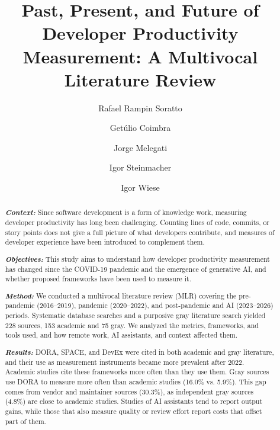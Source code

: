 \documentclass[preprint,number]{elsarticle}
\newcounter{study}
\begin{document}
\begin{frontmatter}

\title{Past, Present, and Future of Developer Productivity Measurement: A Multivocal Literature Review}

\author[a]{Rafael Rampin Soratto}
\author[d]{Getúlio Coimbra}
\author[b]{Jorge Melegati}
\author[c]{Igor Steinmacher}
\author[a]{Igor Wiese}
\address[a]{Graduate Program in Computer Science, State University of Maringá (UEM), Maringá, Paraná, Brazil}
\address[b]{INESC TEC, Faculty of Engineering, University of Porto, Porto, Portugal}
\address[c]{Northern Arizona University, Flagstaff, Arizona, USA}
\address[d]{Federal University of Technology -- Paraná (UTFPR), Campo Mourão, Paraná, Brazil}

\begin{abstract}
\noindent\textit{\textbf{Context:}}
Since software development is a form of knowledge work, measuring developer productivity has long been challenging. Counting lines of code, commits, or story points does not give a full picture of what developers contribute, and measures of developer experience have been introduced to complement them.

\noindent\textit{\textbf{Objectives:}}
This study aims to understand how developer productivity measurement has changed since the COVID-19 pandemic and the emergence of generative AI, and whether proposed frameworks have been used to measure it.

\noindent\textit{\textbf{Method:}}
We conducted a multivocal literature review (MLR) covering the pre-pandemic (2016--2019), pandemic (2020--2022), and post-pandemic and AI (2023--2026) periods. Systematic database searches and a purposive gray literature search yielded 228 sources, 153 academic and 75 gray. We analyzed the metrics, frameworks, and tools used, and how remote work, AI assistants, and context affected them.

\noindent\textit{\textbf{Results:}}
DORA, SPACE, and DevEx were cited in both academic and gray literature, and their use as measurement instruments became more prevalent after 2022. Academic studies cite these frameworks more often than they use them. Gray sources use DORA to measure more often than academic studies (16.0\% vs. 5.9\%). This gap comes from vendor and maintainer sources (30.3\%), as independent gray sources (4.8\%) are close to academic studies. Studies of AI assistants tend to report output gains, while those that also measure quality or review effort report costs that offset part of them.


\end{abstract}
\end{frontmatter}
\end{document}
